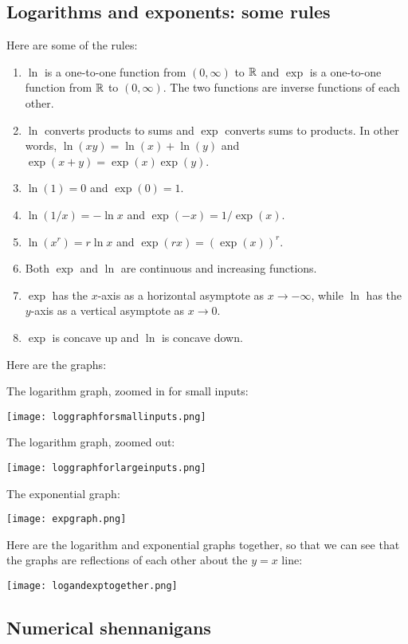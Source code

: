 \documentclass[10pt]{amsart}
\begin{document}
\subsection{Logarithms and exponents: some rules}

Here are some of the rules:

\begin{enumerate}
\item $\ln$ is a one-to-one function from $(0,\infty)$ to $\mathbb{R}$ and
  $\exp$ is a one-to-one function from $\mathbb{R}$ to $(0,\infty)$. The two
  functions are inverse functions of each other.
\item $\ln$ converts products to sums and $\exp$ converts sums to
  products. In other words, $\ln(xy) = \ln(x) + \ln(y)$ and $\exp(x +
  y) = \exp(x)\exp(y)$.
\item $\ln(1) = 0$ and $\exp(0) = 1$.
\item $\ln(1/x) = - \ln x$ and $\exp(-x) = 1/\exp(x)$.
\item $\ln(x^r) = r \ln x$ and $\exp(rx) = (\exp(x))^r$.
\item Both $\exp$ and $\ln$ are continuous and increasing functions.
\item $\exp$ has the $x$-axis as a horizontal asymptote as $x \to
  -\infty$, while $\ln$ has the $y$-axis as a vertical asymptote as $x
  \to 0$.
\item $\exp$ is concave up and $\ln$ is concave down.
\end{enumerate}

Here are the graphs:

The logarithm graph, zoomed in for small inputs:

\texttt{[image: loggraphforsmallinputs.png]}

The logarithm graph, zoomed out:

\texttt{[image: loggraphforlargeinputs.png]}

The exponential graph:

\texttt{[image: expgraph.png]}

Here are the logarithm and exponential graphs together, so that we can
see that the graphs are reflections of each other about the $y = x$ line:

\texttt{[image: logandexptogether.png]}
\subsection{Numerical shennanigans}
\end{document}
